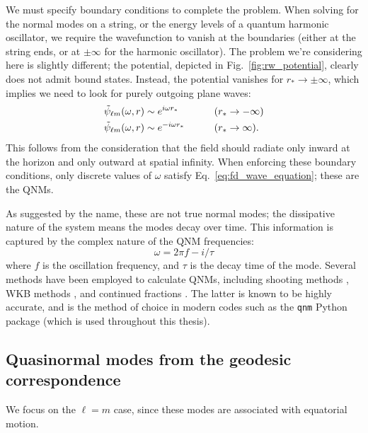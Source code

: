 We must specify boundary conditions to complete the problem. 
When solving for the normal modes on a string, or the energy levels of a quantum harmonic oscillator, we require the wavefunction to vanish at the boundaries (either at the string ends, or at $\pm \infty$ for the harmonic oscillator).
The problem we're considering here is slightly different; the potential, depicted in Fig.~\ref{fig:rw_potential}, clearly does not admit bound states. 
Instead, the potential vanishes for $r_* \rightarrow \pm \infty$, which implies we need to look for purely outgoing plane waves:
\begin{alignat}{2}
    &\tilde{\psi}_{\ell m}(\omega, r) \sim e^{i \omega r_*} \qquad &&\qty(r_* \rightarrow -\infty) \nonumber \\
    &\tilde{\psi}_{\ell m}(\omega, r) \sim e^{- i \omega r_*} \qquad &&\qty(r_* \rightarrow \infty).
\end{alignat}
This follows from the consideration that the field should radiate  only inward at the horizon and only outward at spatial infinity.
When enforcing these boundary conditions, only discrete values of $\omega$ satisfy Eq.~\ref{eq:fd_wave_equation}; these are the QNMs.

As suggested by the name, these are not true normal modes; the dissipative nature of the system means the modes decay over time.
This information is captured by the complex nature of the QNM frequencies:
\begin{equation}
    \omega = 2\pi f - i/\tau
\end{equation}
where $f$ is the oscillation frequency, and $\tau$ is the decay time of the mode.
Several methods have been employed to calculate QNMs, including shooting methods \cite{Chandrasekhar:1975zza}, WKB methods \cite{Schutz:1985km}, and continued fractions \cite{Leaver:1985ax}.
The latter is known to be highly accurate, and is the method of choice in modern codes such as the \texttt{qnm} Python package \cite{Stein:2019mop} (which is used throughout this thesis).

\subsection{Quasinormal modes from the geodesic correspondence}

We focus on the $\ell = m$ case, since these modes are associated with equatorial motion. 

